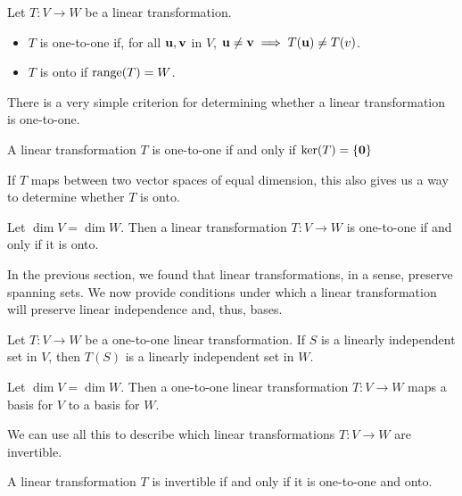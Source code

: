\documentclass[../m73main.tex]{chapters}
\begin{document}
\begin{definition}
	Let $T : V \to W$ be a linear transformation.
	\begin{itemize}
		\item $T$ is one-to-one if, for all $\mathbf{u}, \mathbf{v}$ in $V$, $\mathbf{u} \neq \mathbf{v} \implies T(\mathbf{u}) \neq T(v)$.
		\item $T$ is onto if $\textrm{range}(T) = W$.
	\end{itemize}
\end{definition}

There is a very simple criterion for determining whether a linear transformation is one-to-one.

\begin{theorem}
	A linear transformation $T$ is one-to-one if and only if $\textrm{ker}(T) = \{\mathbf{0}\}$
\end{theorem}

If $T$ maps between two vector spaces of equal dimension, this also gives us a way to determine whether $T$ is onto.

\begin{theorem}
	Let $\dim V = \dim W$.
	Then a linear transformation $T : V \to W$ is one-to-one if and only if it is onto.
\end{theorem}

In the previous section, we found that linear transformations, in a sense, preserve spanning sets.
We now provide conditions under which a linear transformation will preserve linear independence and, thus, bases.

\begin{theorem}
	Let $T : V \to W$ be a one-to-one linear transformation.
	If $S$ is a linearly independent set in $V$, then $T(S)$ is a linearly independent set in $W$.
\end{theorem}

\begin{corollary}
	Let $\dim V = \dim W$.
	Then a one-to-one linear transformation $T : V \to W$ maps a basis for $V$ to a basis for $W$.
\end{corollary}

We can use all this to describe which linear transformations $T : V \to W$ are invertible.

\begin{theorem}
	A linear transformation $T$ is invertible if and only if it is one-to-one and onto.
\end{theorem}
\end{document}
